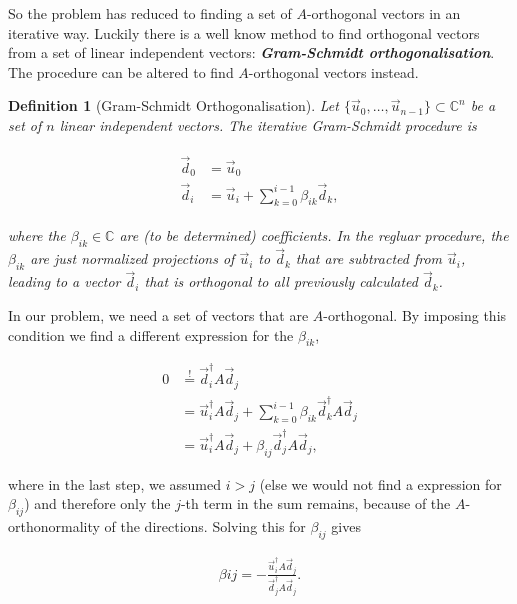 \documentclass{article}
\theoremstyle{plain} %
\newtheorem{definition}{Definition}[section]
\theoremstyle{remark} %
\def\df#1{\textbf{\textit{#1}}}
\numberwithin{equation}{section}
\begin{document}
So the problem has reduced to finding a set of $A$-orthogonal vectors in an iterative way. Luckily there is a well know method to find orthogonal vectors from a set of linear independent vectors: \df{Gram-Schmidt orthogonalisation}. The procedure can be altered to find $A$-orthogonal vectors instead.

\begin{definition}[Gram-Schmidt Orthogonalisation]

Let $\{ \vec{u}_0, \dots, \vec{u}_{n-1} \} \subset \mathbb{C}^n$ be a set of $n$ linear independent vectors. The iterative Gram-Schmidt procedure is

\begin{align}
    \begin{split}
        \vec{d}_0 &= \vec{u}_0 \label{eq:gramschmidt} \\
        \vec{d}_i &= \vec{u}_i + \sum_{k=0}^{i-1} \beta_{ik} \vec{d}_k,
    \end{split}
\end{align}

where the $\beta_{ik} \in \mathbb{C}$ are (to be determined) coefficients. In the regluar procedure, the $\beta_{ik}$ are just normalized projections of $\vec{u}_i$ to $\vec{d}_k$ that are subtracted from $\vec{u}_i$, leading to a vector $\vec{d}_i$ that is orthogonal to all previously calculated $\vec{d}_k$.

\end{definition}

In our problem, we need a set of vectors that are $A$-orthogonal. By imposing this condition we find a different expression for the $\beta_{ik}$,

\begin{align*}
    0 &\stackrel{!}{=} \vec{d}_i^{\dagger} A \vec{d}_j \\
                    &= \vec{u}_i^{\dagger} A \vec{d}_j + \sum_{k=0}^{i-1} \beta_{ik} \vec{d}_k^{\dagger} A \vec{d}_j \\
                    &= \vec{u}_i^{\dagger} A \vec{d}_j + \beta_{ij} \vec{d}_j^{\dagger} A \vec{d}_j,
\end{align*}

where in the last step, we assumed $i>j$ (else we would not find a expression for $\beta_{ij}$) and therefore only the $j$-th term in the sum remains, because of the $A$-orthonormality of the directions. Solving this for $\beta_{ij}$ gives

\begin{align}
    \beta{ij} = - \frac{ \vec{u}_i^{\dagger} A \vec{d}_j }{ \vec{d}_j^{\dagger} A \vec{d}_j }. \label{eq:betas}
\end{align}
\end{document}
